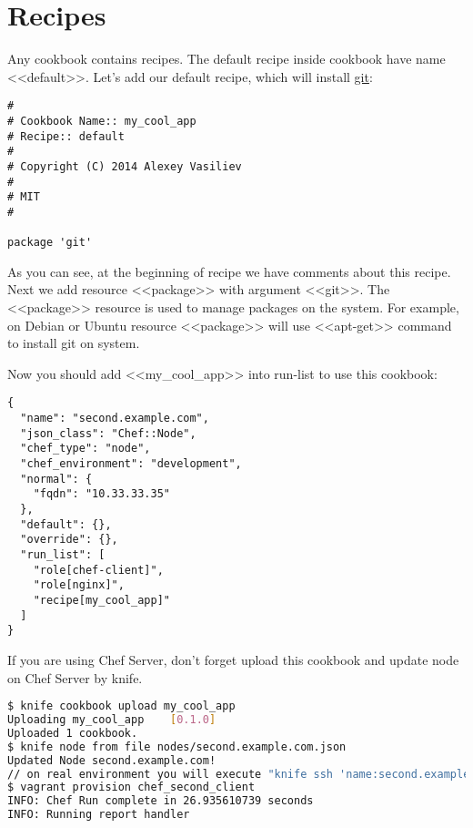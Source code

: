 \section{Recipes}
\label{sec:cookbook-recipes}

Any cookbook contains recipes. The default recipe inside cookbook have name <<default>>. Let's add our default recipe, which will install \href{http://git-scm.com/}{git}:

\begin{lstlisting}[label=lst:cookbook-recipes1,title=my-server-cloud/site-cookbooks/my\_cool\_app/recipes/default.rb]
#
# Cookbook Name:: my_cool_app
# Recipe:: default
#
# Copyright (C) 2014 Alexey Vasiliev
#
# MIT
#

package 'git'
\end{lstlisting}

As you can see, at the beginning of recipe we have comments about this recipe. Next we add resource <<package>> with argument <<git>>. The <<package>> resource is used to manage packages on the system. For example, on Debian or Ubuntu resource <<package>> will use <<apt-get>> command to install git on system.

Now you should add <<my\_cool\_app>> into run-list to use this cookbook:

\begin{lstlisting}[label=lst:cookbook-recipes2,title=my-server-cloud/nodes/second.example.com.json]
{
  "name": "second.example.com",
  "json_class": "Chef::Node",
  "chef_type": "node",
  "chef_environment": "development",
  "normal": {
    "fqdn": "10.33.33.35"
  },
  "default": {},
  "override": {},
  "run_list": [
    "role[chef-client]",
    "role[nginx]",
    "recipe[my_cool_app]"
  ]
}
\end{lstlisting}

If you are using Chef Server, don't forget upload this cookbook and update node on Chef Server by knife.

\begin{lstlisting}[language=Bash,label=lst:cookbook-recipes3]
$ knife cookbook upload my_cool_app
Uploading my_cool_app    [0.1.0]
Uploaded 1 cookbook.
$ knife node from file nodes/second.example.com.json
Updated Node second.example.com!
// on real environment you will execute "knife ssh 'name:second.example.com' 'sudo chef-client' -i ../keys/production.pem -x ubuntu"
$ vagrant provision chef_second_client
INFO: Chef Run complete in 26.935610739 seconds
INFO: Running report handler
\end{lstlisting}

